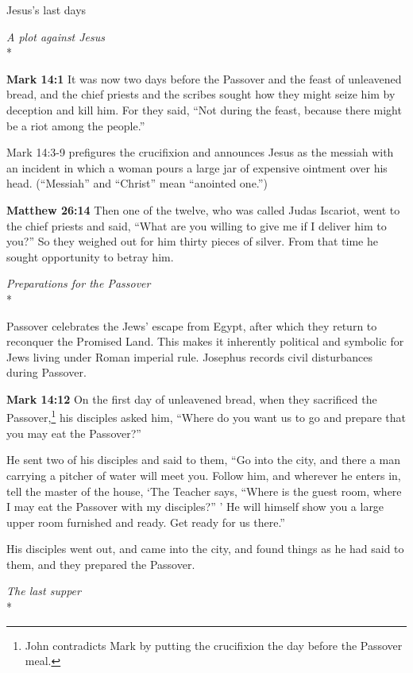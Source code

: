 \documentclass[10pt,twoside]{article} %
\newcommand{\doimage}[2]{\texttt{[image: \#2]}\label{fig:#2}}
\newcommand{\figbasic}[4]{ %
    \ifthenelse{\isodd{\pageref{fig:#2}}}{}{\hfill}
    \ifstrempty{#3}{
      \doimage{#1}{#2}
    }{
      \makebox{\doimage{#1}{#2} \\ #3}
    }
    \ifthenelse{\isodd{\pageref{fig:#2}}}{\hfill}{}
    \par
}
\newcommand{\fig}[2][0.4]{
  \figbasic{#1}{#2}{}{}
}
\newcommand{\quotesize}{\normalsize{}}
\newcommand{\comm}[1]{\begingroup \color{black!50} #1\endgroup}
\newenvironment{quotetext}{\begingroup\quotesize}{\endgroup}
\newcommand{\intex}[1]{\index[texts]{#1}}
\newcommand{\reftex}[1]{#1\intex{#1}}
\newcommand{\bible}[2]{\begin{quotetext}\textbf{#1}\intex{#1} #2\end{quotetext}}
\newcommand{\matthew}[2]{\bible{Matthew #1}{#2}}
\newcommand{\gospelmark}[2]{\bible{Mark #1}{#2}}
\newcommand{\subhead}[1]{\emph{#1}\\*}
\begin{document}
\begin{section}{Jesus's last days}

\subhead{A plot against Jesus}

\gospelmark{14:1}{
It was now two days before the Passover and the feast of unleavened bread, and the chief priests and the scribes sought how they might seize him by deception and kill him.   For they said, ``Not during the feast, because there might be a riot among the people.''}

\comm{\reftex{Mark 14:3-9} prefigures the crucifixion and announces Jesus as the messiah with an incident in which a woman pours a large jar of
expensive ointment over his head. (``Messiah'' and ``Christ'' mean ``anointed one.'')}

\matthew{26:14}{
Then one of the twelve, who was called Judas Iscariot, went to the chief priests   and said, ``What are you willing to give me if I deliver him to you?'' So they weighed out for him thirty pieces of silver.   From that time he sought opportunity to betray him.
}

\subhead{Preparations for the Passover}

\comm{Passover celebrates the Jews' escape from Egypt, after which they return to reconquer the Promised Land. This makes it
inherently political and symbolic for Jews living under Roman imperial rule. 
Josephus records civil disturbances during Passover.}

\gospelmark{14:12}{
  On the first day of unleavened bread, when they sacrificed the Passover,\footnote{John contradicts Mark by putting the crucifixion the day before
the Passover meal.}
his disciples asked him, ``Where do you want us to go and prepare that you may eat the Passover?''

  He sent two of his disciples and said to them, ``Go into the city, and there a man carrying a pitcher of water will meet you. Follow him,    and wherever he enters in, tell the master of the house, `The Teacher says, ``Where is the guest room, where I may eat the Passover with my disciples?'' '    He will himself show you a large upper room furnished and ready. Get ready for us there.''

  His disciples went out, and came into the city, and found things as he had said to them, and they prepared the Passover. 
}

\fig[1]{last-supper}

\subhead{The last supper}


\end{section}
\end{document}
